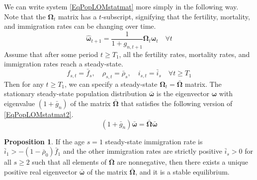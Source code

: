 \documentclass[letterpaper,12pt]{article}
\theoremstyle{definition}
\newtheorem{proposition}{Proposition} %
\begin{document}
    We can write system \eqref{EqPopLOMstatmat} more simply in the following way. Note that the $\bm{\Omega}_t$ matrix has a $t$-subscript, signifying that the fertility, mortality, and immigration rates can be changing over time.
    \begin{equation}\label{EqPopLOMstatmat2}
      \bm{\hat{\omega}}_{t+1} = \frac{1}{1+g_{n,t+1}}\bm{\Omega}_t\bm{\hat{\omega}}_t \quad\forall t
    \end{equation}
    Assume that after some period $t\geq T_1$, all the fertility rates, mortality rates, and immigration rates reach a steady-state.
    \begin{equation}\label{EqFertMortImmSS}
      f_{s,t} = \bar{f}_s,\quad \rho_{s,t}=\bar{\rho}_s, \quad i_{s,t}=\bar{i}_s \quad\forall t\geq T_1
    \end{equation}
    Then for any $t\geq T_1$, we can specify a steady-state $\bm{\Omega}_t=\bm{\bar{\Omega}}$ matrix. The stationary steady-state population distribution $\bm{\bar{\omega}}$ is the eigenvector $\bm{\omega}$ with eigenvalue $(1+\bar{g}_n)$ of the matrix $\bm{\bar{\Omega}}$ that satisfies the following version of \eqref{EqPopLOMstatmat2}.
    \begin{equation}\label{EqPopLOMss}
      (1+\bar{g}_n)\bm{\bar{\omega}} = \bm{\bar{\Omega}}\bm{\bar{\omega}}
    \end{equation}

    \begin{proposition}
      If the age $s=1$ steady-state immigration rate is $\bar{i}_1>-(1-\bar{\rho}_0)\bar{f}_1$ and the other immigration rates are strictly positive $\bar{i}_s>0$ for all $s\geq 2$ such that all elements of $\bm{\bar{\Omega}}$ are nonnegative, then there exists a unique positive real eigenvector $\bm{\bar{\omega}}$ of the matrix $\bm{\bar{\Omega}}$, and it is a stable equilibrium.
    \end{proposition}
\end{document}
